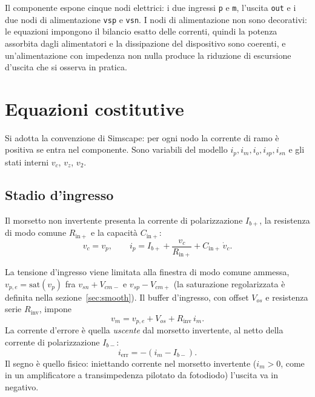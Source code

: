 \documentclass[11pt,a4paper]{article}
\begin{document}
Il componente espone cinque nodi elettrici: i due ingressi \texttt{p} e
\texttt{m}, l'uscita \texttt{out} e i due nodi di alimentazione
\texttt{vsp} e \texttt{vsn}. I nodi di alimentazione non sono decorativi:
le equazioni impongono il bilancio esatto delle correnti, quindi la potenza
assorbita dagli alimentatori e la dissipazione del dispositivo sono
coerenti, e un'alimentazione con impedenza non nulla produce la riduzione
di escursione d'uscita che si osserva in pratica.

\section{Equazioni costitutive}

Si adotta la convenzione di Simscape: per ogni nodo la corrente di ramo è
positiva se entra nel componente. Sono variabili del modello
$i_p, i_m, i_o, i_{sp}, i_{sn}$ e gli stati interni $v_c$, $v_z$, $v_2$.

\subsection{Stadio d'ingresso}

Il morsetto non invertente presenta la corrente di polarizzazione $I_{b+}$,
la resistenza di modo comune $R_{\mathrm{in}+}$ e la capacità
$C_{\mathrm{in}+}$:
\begin{equation}
  v_c = v_p,
  \qquad
  i_p = I_{b+} + \frac{v_c}{R_{\mathrm{in}+}} + C_{\mathrm{in}+}\,\dot v_c .
\end{equation}

La tensione d'ingresso viene limitata alla finestra di modo comune
ammessa, $v_{p,e}=\mathrm{sat}(v_p)$ fra $v_{sn}+V_{cm-}$ e
$v_{sp}-V_{cm+}$ (la saturazione regolarizzata è definita nella
sezione~\ref{sec:smooth}). Il buffer d'ingresso, con offset $V_{os}$ e
resistenza serie $R_{\mathrm{inv}}$, impone
\begin{equation}
  v_m = v_{p,e} + V_{os} + R_{\mathrm{inv}}\, i_m .
  \label{eq:buffer}
\end{equation}
La corrente d'errore è quella \emph{uscente} dal morsetto invertente, al
netto della corrente di polarizzazione $I_{b-}$:
\begin{equation}
  i_{\mathrm{err}} = -\left(i_m - I_{b-}\right).
  \label{eq:ierr}
\end{equation}
Il segno è quello fisico: iniettando corrente nel morsetto invertente
($i_m>0$, come in un amplificatore a transimpedenza pilotato da fotodiodo)
l'uscita va in negativo.
\end{document}
